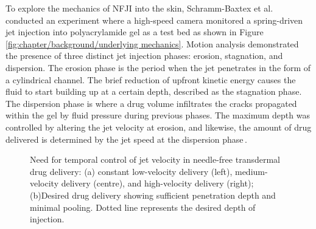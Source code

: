         To explore the mechanics of NFJI into the skin, Schramm-Baxtex et al.\,\cite{Schramm-Baxter2004b} conducted an experiment where a high-speed camera monitored a spring-driven jet injection into polyacrylamide gel as a test bed as shown in Figure\,\ref{fig:chapter/background/underlying mechanics}. Motion analysis demonstrated the presence of three distinct jet injection phases: erosion, stagnation, and dispersion. The erosion phase is the period when the jet penetrates in the form of a cylindrical channel. The brief reduction of upfront kinetic energy causes the fluid to start building up at a certain depth, described as the stagnation phase. The dispersion phase is where a drug volume infiltrates the cracks propagated within the gel by fluid pressure during previous phases. The maximum depth was controlled by altering the jet velocity at erosion, and likewise, the amount of drug delivered is determined by the jet speed at the dispersion phase\,\cite{Stachowiak2009}.
        
        
        \begin{figure}[!ht]
            \centering
            \qquad
            \caption{
                Need for temporal control of jet velocity in needle-free transdermal drug delivery: (a) constant low-velocity delivery (left), medium-velocity delivery (centre), and high-velocity delivery (right); (b)Desired drug delivery showing sufficient penetration depth and minimal pooling. Dotted line represents the desired depth of injection.
            }   \label{fig:chapter/background/2 speeds mechanics}
        \end{figure}
        
